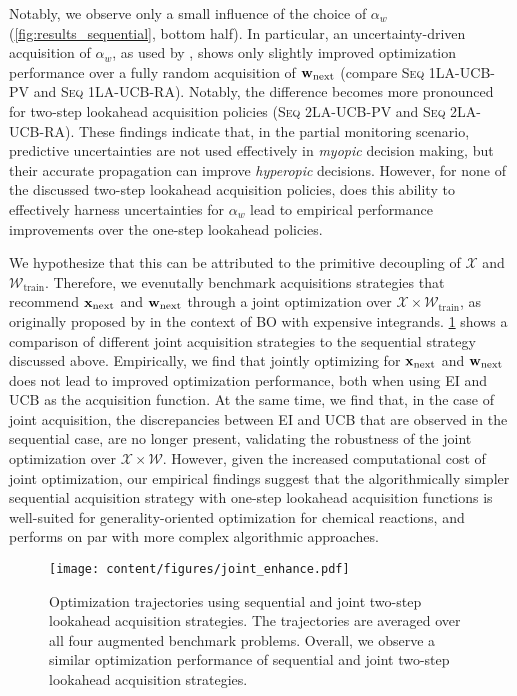 Notably, we observe only a small influence of the choice of $\alpha_w$ (\cref{fig:results_sequential}, bottom half).
In particular, an uncertainty-driven acquisition of $\alpha_w$, as used by \citet{angello_closed-loop_2022}, shows only slightly improved optimization performance over a fully random acquisition of ${\mathbf{w}}_{\text{next}}$ (compare \textsc{Seq 1LA-UCB-PV} and \textsc{Seq 1LA-UCB-RA}).
Notably, the difference becomes more pronounced for two-step lookahead acquisition policies (\textsc{Seq 2LA-UCB-PV} and \textsc{Seq 2LA-UCB-RA}). 
These findings indicate that, in the partial monitoring scenario, predictive uncertainties are not used effectively in \textit{myopic} decision making, but their accurate propagation can improve \textit{hyperopic} decisions. 
However, for none of the discussed two-step lookahead acquisition policies, does this ability to effectively harness uncertainties for $\alpha_w$ lead to empirical performance improvements over the one-step lookahead policies. 

We hypothesize that this can be attributed to the primitive decoupling of $\mathcal{X}$ and $\mathcal{W}_{\text{train}}$. 
Therefore, we evenutally benchmark acquisitions strategies that recommend ${\mathbf{x}}_{\text{next}}$ and ${\mathbf{w}}_{\text{next}}$ through a joint optimization over $\mathcal{X} \times \mathcal{W}_{\text{train}}$, as originally proposed by \citet{toscano-palmerin_bayesian_2018} in the context of BO with expensive integrands. 
\cref{fig:results_joint} shows a comparison of different joint acquisition strategies to the sequential strategy discussed above. 
Empirically, we find that jointly optimizing for ${\mathbf{x}}_{\text{next}}$ and ${\mathbf{w}}_{\text{next}}$ does not lead to improved optimization performance, both when using EI and UCB as the acquisition function. 
At the same time, we find that, in the case of joint acquisition, the discrepancies between EI and UCB that are observed in the sequential case, are no longer present, validating the robustness of the joint optimization over $\mathcal{X} \times \mathcal{W}$. 
However, given the increased computational cost of joint optimization, our empirical findings suggest that the algorithmically simpler sequential acquisition strategy with one-step lookahead acquisition functions is well-suited for generality-oriented optimization for chemical reactions, and performs on par with more complex algorithmic approaches.


\begin{figure}[t]
    \centering
    \texttt{[image: content/figures/joint\_enhance.pdf]}
    
    \vspace{-1em}
    
    \caption{Optimization trajectories using sequential and joint two-step lookahead acquisition strategies. The trajectories are averaged over all four augmented benchmark problems. Overall, we observe a similar optimization performance of sequential and joint two-step lookahead acquisition strategies.}
    \label{fig:results_joint}
\end{figure}

